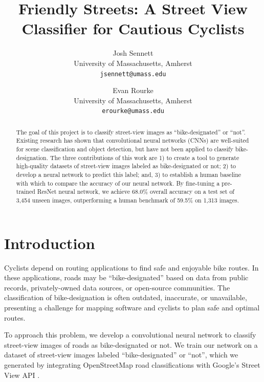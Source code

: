 \documentclass[10pt,twocolumn,letterpaper]{article}
\begin{document}
\title{Friendly Streets: A Street View Classifier for Cautious Cyclists}

\author{Josh Sennett\\
University of Massachusetts, Amherst\\
{\tt\small jsennett@umass.edu}
\and
Evan Rourke\\
University of Massachusetts, Amherst\\
{\tt\small erourke@umass.edu}
}

\maketitle

\begin{abstract}
The goal of this project is to classify street-view images as ``bike-designated'' or ``not''. Existing research has shown that convolutional neural networks (CNNs) are well-suited for scene classification and object detection, but have not been applied to classify bike-designation. The three contributions of this work are 1) to create a tool to generate high-quality datasets of street-view images labeled as bike-designated or not; 2) to develop a neural network to predict this label; and, 3) to establish a human baseline with which to compare the accuracy of our neural network. By fine-tuning a pre-trained ResNet neural network, we achieve 68.0\% overall accuracy on a test set of 3,454 unseen images, outperforming a human benchmark of 59.5\% on 1,313 images.
\end{abstract}

\section{Introduction}
\label{sec:intro}

Cyclists depend on routing applications to find safe and enjoyable bike routes. In these applications, roads may be ``bike-designated'' based on data from public records, privately-owned data sources, or open-source communities. The classification of bike-designation is often outdated, inaccurate, or unavailable, presenting a challenge for mapping software and cyclists to plan safe and optimal routes.

To approach this problem, we develop a convolutional neural network to classify street-view images of roads as bike-designated or not. We train our network on a dataset of street-view images labeled ``bike-designated'' or ``not'', which we generated by integrating OpenStreetMap \cite{osm} road classifications with Google's Street View API \cite{googlesv}.
\end{document}
